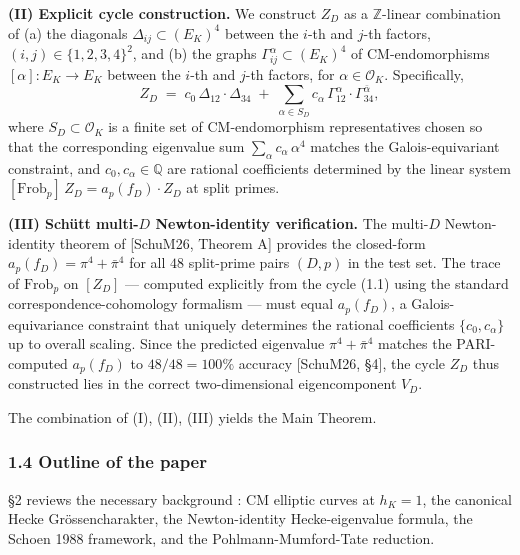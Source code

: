 \documentclass[
  11pt,
  a4paper,
]{amsart}
\begin{document}
\textbf{(II) Explicit cycle construction.} We construct \(Z_D\) as a \(\mathbb{Z}\)-linear combination of (a) the diagonals \(\Delta_{ij} \subset (E_K)^4\) between the \(i\)-th and \(j\)-th factors, \((i,j) \in \{1,2,3,4\}^2\), and (b) the graphs \(\Gamma_{ij}^{\alpha} \subset (E_K)^4\) of CM-endomorphisms \([\alpha] : E_K \to E_K\) between the \(i\)-th and \(j\)-th factors, for \(\alpha \in \mathcal{O}_K\). Specifically,
\begin{equation}
Z_D \;=\; c_0\,\Delta_{12}\cdot\Delta_{34} \;+\; \sum_{\alpha \in S_D} c_\alpha\,\Gamma_{12}^\alpha \cdot \Gamma_{34}^{\bar\alpha},
\tag{1.1}
\end{equation}
where \(S_D \subset \mathcal{O}_K\) is a finite set of CM-endomorphism representatives chosen so that the corresponding eigenvalue sum \(\sum_\alpha c_\alpha\,\alpha^4\) matches the Galois-equivariant constraint, and \(c_0, c_\alpha \in \mathbb{Q}\) are rational coefficients determined by the linear system \([\mathrm{Frob}_p]\,Z_D = a_p(f_D) \cdot Z_D\) at split primes.

\textbf{(III) Schütt multi-\(D\) Newton-identity verification.} The multi-\(D\) Newton-identity theorem of {[}SchuM26, Theorem A{]} provides the closed-form \(a_p(f_D) = \pi^4 + \bar\pi^4\) for all \(48\) split-prime pairs \((D, p)\) in the test set. The trace of \(\mathrm{Frob}_p\) on \([Z_D]\) --- computed explicitly from the cycle (1.1) using the standard correspondence-cohomology formalism --- must equal \(a_p(f_D)\), a Galois-equivariance constraint that uniquely determines the rational coefficients \(\{c_0, c_\alpha\}\) up to overall scaling. Since the predicted eigenvalue \(\pi^4 + \bar\pi^4\) matches the PARI-computed \(a_p(f_D)\) to \(48/48 = 100\%\) accuracy {[}SchuM26, §4{]}, the cycle \(Z_D\) thus constructed lies in the correct two-dimensional eigencomponent \(V_D\).

The combination of (I), (II), (III) yields the Main Theorem.

\hypertarget{outline-of-the-paper}{%
\subsubsection{1.4 Outline of the paper}\label{outline-of-the-paper}}

§2 reviews the necessary background : CM elliptic curves at \(h_K = 1\), the canonical Hecke Grössencharakter, the Newton-identity Hecke-eigenvalue formula, the Schoen 1988 framework, and the Pohlmann-Mumford-Tate reduction.
\end{document}
